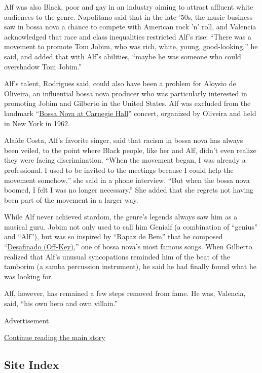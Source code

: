 Alf was also Black, poor and gay in an industry aiming to attract
affluent white audiences to the genre. Napolitano said that in the late
'50s, the music business saw in bossa nova a chance to compete with
American rock 'n' roll, and Valencia acknowledged that race and class
inequalities restricted Alf's rise: ``There was a movement to promote
Tom Jobim, who was rich, white, young, good-looking,'' he said, and
added that with Alf's abilities, ``maybe he was someone who could
overshadow Tom Jobim.''

Alf's talent, Rodrigues said, could also have been a problem for Aloysio
de Oliveira, an influential bossa nova producer who was particularly
interested in promoting Jobim and Gilberto in the United States. Alf was
excluded from the landmark
``\href{https://www.youtube.com/watch?v=JfVPnYSLmvA}{Bossa Nova at
Carnegie Hall}'' concert, organized by Oliveira and held in New York in
1962.

Alaíde Costa, Alf's favorite singer, said that racism in bossa nova has
always been veiled, to the point where Black people, like her and Alf,
didn't even realize they were facing discrimination. ``When the movement
began, I was already a professional. I used to be invited to the
meetings because I could help the movement somehow,'' she said in a
phone interview. ``But when the bossa nova boomed, I felt I was no
longer necessary.'' She added that she regrets not having been part of
the movement in a larger way.

While Alf never achieved stardom, the genre's legends always saw him as
a musical guru. Jobim not only used to call him Genialf (a combination
of ``genius'' and ``Alf''), but was so inspired by ``Rapaz de Bem'' that
he composed
``\href{https://www.youtube.com/watch?v=OUK5ay_8G-w}{Desafinado
(Off-Key)},'' one of bossa nova's most famous songs. When Gilberto
realized that Alf's unusual syncopations reminded him of the beat of the
tamborim (a samba percussion instrument), he said he had finally found
what he was looking for.

Alf, however, has remained a few steps removed from fame. He was,
Valencia, said, ``his own hero and own villain.''

Advertisement

\protect\hyperlink{after-bottom}{Continue reading the main story}

\hypertarget{site-index}{%
\subsection{Site Index}\label{site-index}}

